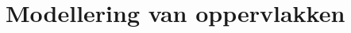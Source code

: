 \documentclass[computergesteund_ontwerp_van_curven_en_oppervlakken.tex]{subfiles}
\begin{document}
\chapter{Modellering van oppervlakken}

\end{document}
